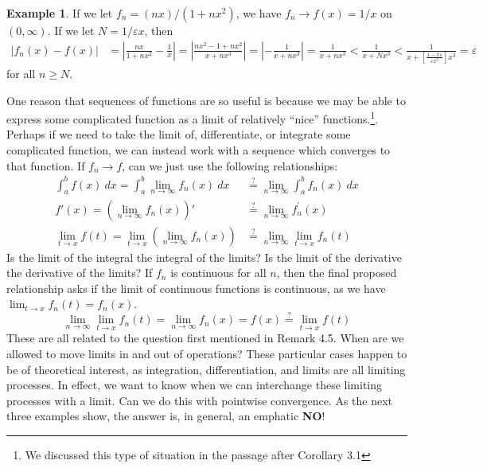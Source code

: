 \documentclass{article}
\theoremstyle{definition}
\newtheorem{example}{Example}[section]
\begin{document}
\begin{example}
	If we let $ f_n=(nx)/(1+nx^2) $, we have $ f_n\to f(x)=1/x $ on $ (0,\infty) $. 
	If we let $ N=1/\varepsilon x $, then \begin{align*}
		|f_n(x)-f(x)|&=\left\lvert\frac{nx}{1+nx^2}-\frac{1}{x}\right\rvert=\left\lvert\frac{nx^2-1+nx^2}{x+nx^3}\right\rvert=\left\lvert-\frac{1}{x+nx^3}\right\rvert=\frac{1}{x+nx^3}<\frac{1}{x+Nx^3}<\frac{1}{x+\left[\frac{1-x\varepsilon}{\varepsilon x^3}\right]x^3}=\varepsilon
	\end{align*} for all $ n\ge N $. 
\end{example}
One reason that sequences of functions are so useful is because we may be able to express some complicated function as a limit of relatively ``nice'' functions.\footnote{We discussed this type of situation in the passage after Corollary 3.1}. Perhaps if we need to take the limit of, differentiate, or integrate some complicated function, we can instead work with a sequence which converges to that function. If $ f_n\to f $, can we just use the following relationships:
\begin{align*}
	\int_{a}^{b}f(x)\ dx=\int_{a}^{b}\lim\limits_{n\to\infty}f_n(x)\ dx&\stackrel{?}{=}\lim\limits_{n\to\infty}\int_{a}^{b}f_n(x)\ dx\\
	f'(x)=\left(\lim\limits_{n\to\infty}f_n(x)\right)'&\stackrel{?}{=}\lim\limits_{n\to\infty}f_n^\prime(x)\\
	\lim\limits_{t\to x}f(t)= \lim\limits_{t\to x }\left(\lim\limits_{n\to\infty}f_n(x)\right)&\stackrel{?}{=}\lim\limits_{n\to\infty}\lim\limits_{t\to x}f_n(t)
\end{align*}
Is the limit of the integral the integral of the limits? Is the limit of the derivative the derivative of the limits? If $ f_n $ is continuous for all $ n $, then the final proposed relationship asks if the limit of continuous functions is continuous, as we have $ \lim_{t\to x}f_n(t)=f_n(x) $. $$	\lim\limits_{n\to\infty}\lim\limits_{t\to x}f_n(t)=\lim\limits_{n\to \infty }f_n(x)=f(x)\stackrel{?}{=}\lim_{t\to x} f(t) $$
These are all related to the question first mentioned in Remark 4.5. When are we allowed to move limits in and out of operations? These particular cases happen to be of theoretical interest, as integration, differentiation, and limits are all limiting processes. In effect, we want to know when we can interchange these limiting processes with a limit. Can we do this with pointwise convergence. As the next three examples show, the answer is, in general, an emphatic \textbf{NO}!
\end{document}
